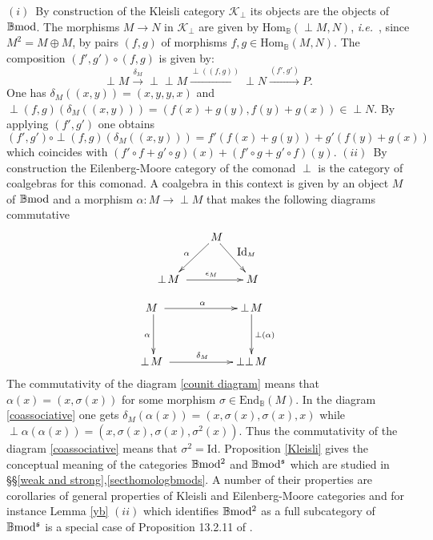 \documentclass[12pt]{article}
\def\End{{\rm End}}
\def\Hom{{\rm Hom}}
\def\id{{\rm id}}
\def\B{{\mathbb B}}
\def\cK{{\mathcal K}}
\newcommand{\ie}{{\it i.e.\/}\ }
\def\id{{\mbox{Id}}}
\def\Hom {{\mbox{Hom}}}
\def\End{{\mbox{End}}}
\def\bmod{{\rm \B mod}}
\def\bm2{{\rm \B mod^2}}
\def\b2{{\rm \B mod^{\mathfrak s}}}
\begin{document}
\proof $(i)$~By construction of the Kleisli category $\cK_\perp$ its objects are the objects of $\bmod$. The morphisms $M\to N$ in $\cK_\perp$  are given by $\Hom_\B(\perp\! M,N)$, \ie, since $M^2=M\oplus M$, by pairs $(f,g)$ of morphisms $f,g\in \Hom_\B(M,N)$. The composition $(f',g')\circ (f,g)$ is given by: 
$$
\perp\! M\stackrel{\delta_M}{\to}\perp\perp\! M\stackrel{\perp((f,g))}{\to}\perp\! N\stackrel{(f',g')}{\to}P.
$$
One has $\delta_M((x,y))=(x,y,y,x)$ and  $\perp\!(f,g)(\delta_M((x,y)))=(f(x)+g(y),f(y)+g(x))\in \perp\! N$.
By applying $(f',g')$ one obtains 
$$
(f',g')\circ \perp\!(f,g)(\delta_M((x,y)))=f'(f(x)+g(y))+g'(f(y)+g(x))
$$ 
which coincides with $(f'\circ f+g'\circ g)(x)+(f'\circ g+g'\circ f)(y)$.\newline
$(ii)$~By construction the Eilenberg-Moore category of the comonad $\perp$ is the category of coalgebras for this comonad.
 A coalgebra in this context is given by an object $M$ of $\bmod$ and a morphism $\alpha:M\to \perp\! M$ that makes the following diagrams commutative
\begin{equation}\label{counit diagram}
\xymatrix@C=15pt@R=25pt{
 & \ M\ar[ld]_{\alpha}\ar[rd]^{\id_M} 
\\
\perp\! M \ \ar[rr]^{\epsilon_M}&& M}
\end{equation} 
	
	\begin{equation}\label{coassociative}
\xymatrix@C=25pt@R=35pt{
 M \ \ar[d]_{\alpha}\ar[rr]^{\alpha} && \perp\! M \ar[d]^{\perp(\alpha)}
\\
\perp\! M \ \ar[rr]^{\delta_M}&& \perp\perp\! M}
\end{equation}
 The commutativity of the diagram \eqref{counit diagram} means that $\alpha(x)=(x,\sigma(x))$ for some morphism $\sigma\in \End_\B(M)$. In the diagram \eqref{coassociative} one gets $\delta_M(\alpha(x))=(x,\sigma(x),\sigma(x),x)$ while $\perp\!\alpha(\alpha(x))=(x,\sigma(x),\sigma(x),\sigma^2(x))$. Thus the commutativity of the diagram \eqref{coassociative} means that $\sigma^2=\id$. \endproof 
Proposition \ref{Kleisli} gives the conceptual meaning of the categories $\bm2$ and $\b2$ which are studied in \S\S\ref{weak and strong},\ref{secthomologbmods}. A number of their properties  are corollaries   of  general properties of Kleisli and Eilenberg-Moore categories and for instance Lemma \ref{yb} $(ii)$ which identifies $\bm2$ as a full subcategory of $\b2$ is a special case of Proposition 13.2.11 of \cite{lambdacalc}. 
\end{document}
